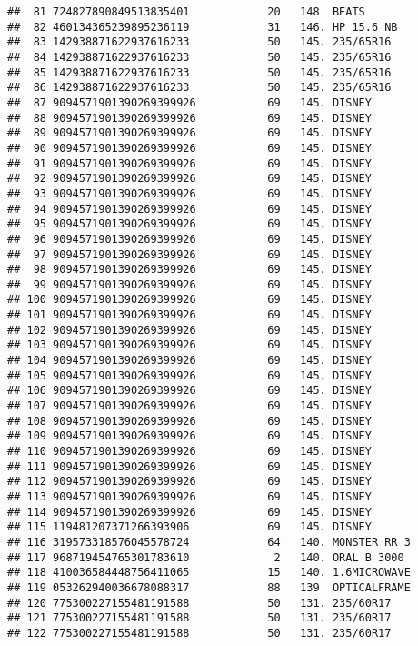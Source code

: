 \documentclass[]{article}
\begin{document}
\begin{verbatim}
##  81 724827890849513835401            20   148  BEATS       
##  82 460134365239895236119            31   146. HP 15.6 NB  
##  83 142938871622937616233            50   145. 235/65R16   
##  84 142938871622937616233            50   145. 235/65R16   
##  85 142938871622937616233            50   145. 235/65R16   
##  86 142938871622937616233            50   145. 235/65R16   
##  87 9094571901390269399926           69   145. DISNEY      
##  88 9094571901390269399926           69   145. DISNEY      
##  89 9094571901390269399926           69   145. DISNEY      
##  90 9094571901390269399926           69   145. DISNEY      
##  91 9094571901390269399926           69   145. DISNEY      
##  92 9094571901390269399926           69   145. DISNEY      
##  93 9094571901390269399926           69   145. DISNEY      
##  94 9094571901390269399926           69   145. DISNEY      
##  95 9094571901390269399926           69   145. DISNEY      
##  96 9094571901390269399926           69   145. DISNEY      
##  97 9094571901390269399926           69   145. DISNEY      
##  98 9094571901390269399926           69   145. DISNEY      
##  99 9094571901390269399926           69   145. DISNEY      
## 100 9094571901390269399926           69   145. DISNEY      
## 101 9094571901390269399926           69   145. DISNEY      
## 102 9094571901390269399926           69   145. DISNEY      
## 103 9094571901390269399926           69   145. DISNEY      
## 104 9094571901390269399926           69   145. DISNEY      
## 105 9094571901390269399926           69   145. DISNEY      
## 106 9094571901390269399926           69   145. DISNEY      
## 107 9094571901390269399926           69   145. DISNEY      
## 108 9094571901390269399926           69   145. DISNEY      
## 109 9094571901390269399926           69   145. DISNEY      
## 110 9094571901390269399926           69   145. DISNEY      
## 111 9094571901390269399926           69   145. DISNEY      
## 112 9094571901390269399926           69   145. DISNEY      
## 113 9094571901390269399926           69   145. DISNEY      
## 114 9094571901390269399926           69   145. DISNEY      
## 115 119481207371266393906            69   145. DISNEY      
## 116 319573318576045578724            64   140. MONSTER RR 3
## 117 968719454765301783610             2   140. ORAL B 3000 
## 118 410036584448756411065            15   140. 1.6MICROWAVE
## 119 053262940036678088317            88   139  OPTICALFRAME
## 120 775300227155481191588            50   131. 235/60R17   
## 121 775300227155481191588            50   131. 235/60R17   
## 122 775300227155481191588            50   131. 235/60R17   

\end{verbatim}
\end{document}
